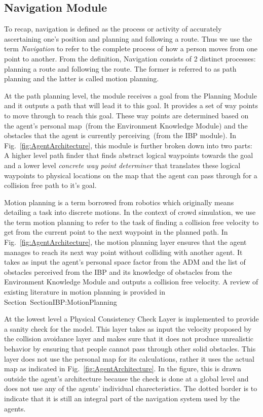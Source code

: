 \subsection{Navigation Module}
\label{IBEVAC:NavigationModule}

To recap, navigation is defined as the process or activity of accurately ascertaining one's position and planning and following a route. Thus we use the term \emph{Navigation} to refer to the complete process of how a person moves from one point to another. From the definition, Navigation consists of 2 distinct processes: planning a route and following the route. The former is referred to as path planning and the latter is called motion planning. 

At the path planning level, the module receives a goal from the Planning Module and it outputs a path that will lead it to this goal. It provides a set of way points to move through to reach this goal. These way points are determined based on the agent's personal map~(from the Environment Knowledge Module) and the obstacles that the agent is currently perceiving~(from the IBP module). In Fig.~\ref{fig:AgentArchitecture}, this module is further broken down into two parts: A higher level path finder that finds abstract logical waypoints towards the goal and a lower level \emph{concrete way point determiner} that translates these logical waypoints to physical locations on the map that the agent can pass through for a collision free path to it's goal. 

Motion planning is a term borrowed from robotics which originally means detailing a task into discrete motions. In the context of crowd simulation, we use the term motion planning to refer to the task of finding a collision free velocity to get from the current point to the next waypoint in the planned path. In Fig.~\ref{fig:AgentArchitecture}, the motion planning layer ensures that the agent manages to reach its next way point without colliding with another agent. It takes as input the agent's personal space factor from the ADM and the list of obstacles perceived from the IBP and its knowledge of obstacles from the Environment Knowledge Module and outputs a collision free velocity. A review of existing literature in motion planning is provided in Section~{SectionIBP:MotionPlanning}
	
At the lowest level a Physical Consistency Check Layer is implemented to provide a sanity check for the model. This layer takes as input the velocity proposed by the collision avoidance layer and makes sure that it does not produce unrealistic behavior by ensuring that people cannot pass through other solid obstacles. This layer does not use the personal map for its calculations, rather it uses the actual map as indicated in Fig.~\ref{fig:AgentArchitecture}. In the figure, this is drawn outside the agent's architecture because the check is done at a global level and does not use any of the agents' individual charecteristics. The dotted border is to indicate that it is still an integral part of the navigation system used by the agents.


